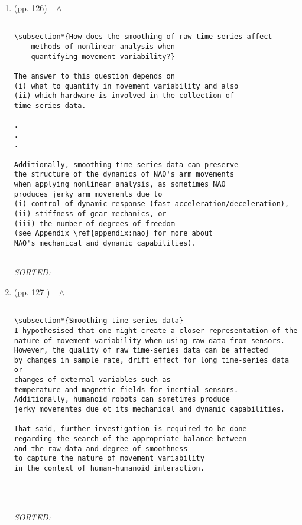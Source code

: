 \documentclass[12pt]{article}
\begin{document}
\begin{enumerate}

\item  (pp. 126)  \_$\wedge$  

	\begin{verbatim}
	
\subsection*{How does the smoothing of raw time series affect 
	methods of nonlinear analysis when 
	quantifying movement variability?}

The answer to this question depends on 
(i) what to quantify in movement variability and also 
(ii) which hardware is involved in the collection of 
time-series data. 

.
.
.

Additionally, smoothing time-series data can preserve 
the structure of the dynamics of NAO's arm movements 
when applying nonlinear analysis, as sometimes NAO 
produces jerky arm movements due to  
(i) control of dynamic response (fast acceleration/deceleration), 
(ii) stiffness of gear mechanics, or 
(iii) the number of degrees of freedom
(see Appendix \ref{appendix:nao} for more about 
NAO's mechanical and dynamic capabilities).


	\end{verbatim}
	\textit{
	SORTED:  
	}
	\\



\item  (pp. 127 )  \_$\wedge$  

	\begin{verbatim}

\subsection*{Smoothing time-series data}
I hypothesised that one might create a closer representation of the 
nature of movement variability when using raw data from sensors.
However, the quality of raw time-series data can be affected 
by changes in sample rate, drift effect for long time-series data or 
changes of external variables such as 
temperature and magnetic fields for inertial sensors. 
Additionally, humanoid robots can sometimes produce
jerky movementes due ot its mechanical and dynamic capabilities.

That said, further investigation is required to be done
regarding the search of the appropriate balance between 
and the raw data and degree of smoothness 
to capture the nature of movement variability
in the context of human-humanoid interaction. 


	
	\end{verbatim}
	\textit{
	SORTED:  
	}
	\\


\end{enumerate}
\end{document}
